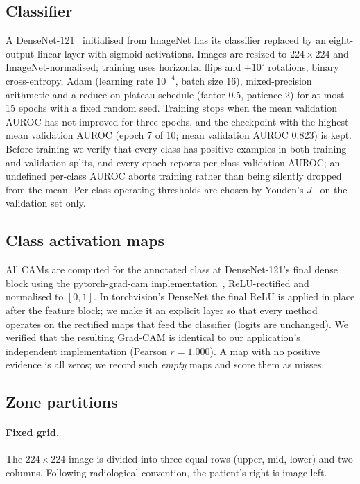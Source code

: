 \documentclass[pdflatex,sn-mathphys-num]{sn-jnl}
\begin{document}
\subsection{Classifier}
A DenseNet-121~\cite{huang2017densenet} initialised from ImageNet has its classifier replaced by an eight-output linear layer with sigmoid activations. Images are resized to $224\times224$ and ImageNet-normalised; training uses horizontal flips and $\pm10^\circ$ rotations, binary cross-entropy, Adam (learning rate $10^{-4}$, batch size 16), mixed-precision arithmetic and a reduce-on-plateau schedule (factor 0.5, patience 2) for at most 15 epochs with a fixed random seed. Training stops when the mean validation AUROC has not improved for three epochs, and the checkpoint with the highest mean validation AUROC (epoch 7 of 10; mean validation AUROC 0.823) is kept. Before training we verify that every class has positive examples in both training and validation splits, and every epoch reports per-class validation AUROC; an undefined per-class AUROC aborts training rather than being silently dropped from the mean. Per-class operating thresholds are chosen by Youden's $J$~\cite{youden1950} on the validation set only.

\subsection{Class activation maps}
All CAMs are computed for the annotated class at DenseNet-121's final dense block using the pytorch-grad-cam implementation~\cite{gildenblat2021pytorchgradcam}, ReLU-rectified and normalised to $[0,1]$. In torchvision's DenseNet the final ReLU is applied in place after the feature block; we make it an explicit layer so that every method operates on the rectified maps that feed the classifier (logits are unchanged). We verified that the resulting Grad-CAM is identical to our application's independent implementation (Pearson $r=1.000$). A map with no positive evidence is all zeros; we record such \emph{empty} maps and score them as misses.

\subsection{Zone partitions}
\paragraph{Fixed grid.} The $224\times224$ image is divided into three equal rows (upper, mid, lower) and two columns. Following radiological convention, the patient's right is image-left.
\end{document}
